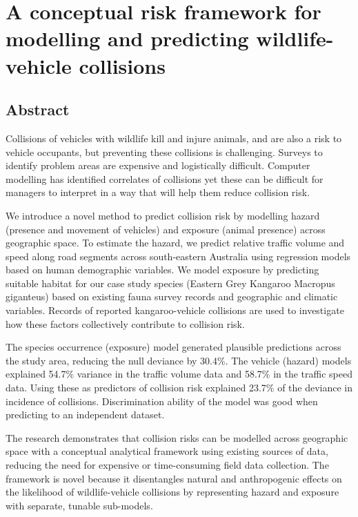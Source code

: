 \chapter{A conceptual risk framework for modelling and predicting wildlife-vehicle collisions}\label{sec:egk}
\newpage

\begin{localsize}{10}
\section*{\centering Abstract}

Collisions of vehicles with wildlife kill and injure animals, and are also a risk to vehicle occupants, but preventing these collisions is challenging. Surveys to identify problem areas are expensive and logistically difficult. Computer modelling has identified correlates of collisions yet these can be difficult for managers to interpret in a way that will help them reduce collision risk.

We introduce a novel method to predict collision risk by modelling hazard (presence and movement of vehicles) and exposure (animal presence) across geographic space. To estimate the hazard, we predict relative traffic volume and speed along road segments across south-eastern Australia using regression models based on human demographic variables. We model exposure by predicting suitable habitat for our case study species (Eastern Grey Kangaroo Macropus giganteus) based on existing fauna survey records and geographic and climatic variables. Records of reported kangaroo-vehicle collisions are used to investigate how these factors collectively contribute to collision risk.

The species occurrence (exposure) model generated plausible predictions across the study area, reducing the null deviance by 30.4\%. The vehicle (hazard) models explained 54.7\% variance in the traffic volume data and 58.7\% in the traffic speed data. Using these as predictors of collision risk explained 23.7\% of the deviance in incidence of collisions. Discrimination ability of the model was good when predicting to an independent dataset.

The research demonstrates that collision risks can be modelled across geographic space with a conceptual analytical framework using existing sources of data, reducing the need for expensive or time-consuming field data collection. The framework is novel because it disentangles natural and anthropogenic effects on the likelihood of wildlife-vehicle collisions by representing hazard and exposure with separate, tunable sub-models.

\end{localsize}

